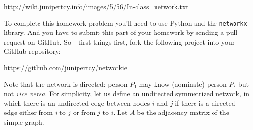 \documentclass[10pt]{article}
\begin{document}
\begin{enumerate}
{	\begin{center}
		\url{http://wiki.junipertcy.info/images/5/56/In-class_network.txt}
	\end{center}
	
	To complete this homework problem you'll need to use Python and the \texttt{networkx} library. And you have to submit this part of your homework by sending a pull request on GitHub. So -- first things first, fork the following project into your GitHub repository:
	
	\begin{center}
		\url{https://github.com/junipertcy/networkie}
	\end{center}
	
	Note that the network is directed: person $P_1$ may know (nominate) person $P_2$ but not {\it vice versa}. For simplicity, let us define an undirected symmetrized network, in which there is an undirected edge between nodes $i$ and $j$ if there is a directed edge either from $i$ to $j$ or from $j$ to $i$. Let $A$ be the adjacency matrix of the simple graph.
	
}
\end{enumerate}
\end{document}

